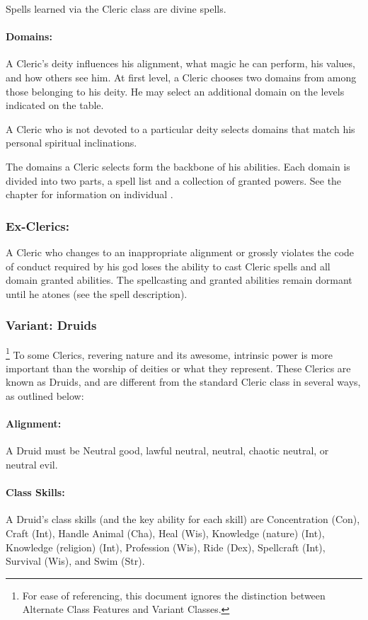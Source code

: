 Spells learned via the Cleric class are divine spells.
\paragraph{Domains:}
A Cleric's deity influences his alignment, what magic he can perform, his values, and how others see him. 
At first level, a Cleric chooses two domains from among those belonging to his deity.
He may select an additional domain on the levels indicated on the  table.

A Cleric who is not devoted to a particular deity selects domains that match his personal spiritual inclinations.

The domains a Cleric selects form the backbone of his abilities.
Each domain is divided into two parts, a spell list and a collection of granted powers.
See the  chapter for information on individual .
\subsubsection{Ex-Clerics:}
A Cleric who changes to an inappropriate alignment or grossly violates the code of conduct required by his god loses the ability to cast Cleric spells and all domain granted abilities.
The spellcasting and granted abilities remain dormant until he atones (see the  spell description).
\subsubsection[Druid]{Variant: Druids}\footnote{For ease of referencing, this document ignores the distinction between Alternate Class Features and Variant Classes.}
\label{sec:Druid}
To some Clerics, revering nature and its awesome, intrinsic power is more important than the worship of deities or what they represent.
These Clerics are known as Druids, and are different from the standard Cleric class in several ways, as outlined below:

\paragraph{Alignment:} A Druid must be Neutral good, lawful neutral, neutral, chaotic neutral, or neutral evil.

\paragraph{Class Skills:} A Druid's class skills (and the key ability for each skill) are Concentration (Con), Craft (Int), Handle Animal (Cha), Heal (Wis), Knowledge (nature) (Int), Knowledge (religion) (Int), Profession (Wis), Ride (Dex), Spellcraft (Int), Survival (Wis), and Swim (Str).

